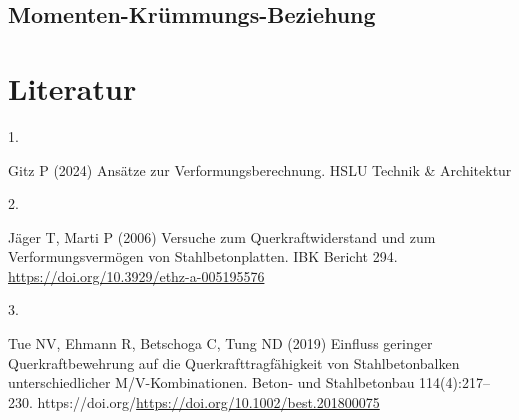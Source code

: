\documentclass[
  10pt,
  letterpaper,
]{scrreprt}
\newlength{\cslhangindent}
\newlength{\csllabelwidth}
\newenvironment{CSLReferences}[2] %
 {\begin{list}{}{%
  \setlength{\itemindent}{0pt}
  \setlength{\leftmargin}{0pt}
  \setlength{\parsep}{0pt}
  \ifodd #1
   \setlength{\leftmargin}{\cslhangindent}
   \setlength{\itemindent}{-1\cslhangindent}
  \fi
  \setlength{\itemsep}{#2\baselineskip}}}
 {\end{list}}
\newcommand{\CSLLeftMargin}[1]{\parbox[t]{\csllabelwidth}{\strut#1\strut}}
\newcommand{\CSLRightInline}[1]{\parbox[t]{\linewidth - \csllabelwidth}{\strut#1\strut}}
\begin{document}
\section{Momenten-Krümmungs-Beziehung}\label{momenten-kruxfcmmungs-beziehung}


\chapter*{Literatur}\label{literatur}


\label{refs}
\begin{CSLReferences}{0}{1}
\CSLLeftMargin{1. }%
\CSLRightInline{Gitz P (2024) Ansätze zur {Verformungsberechnung}. HSLU
Technik \& Architektur}

\CSLLeftMargin{2. }%
\CSLRightInline{Jäger T, Marti P (2006) Versuche zum
{Querkraftwiderstand} und zum {Verformungsvermögen} von
{Stahlbetonplatten}. IBK Bericht 294.
\url{https://doi.org/10.3929/ethz-a-005195576}}

\CSLLeftMargin{3. }%
\CSLRightInline{Tue NV, Ehmann R, Betschoga C, Tung ND (2019) Einfluss
geringer {Querkraftbewehrung} auf die {Querkrafttragfähigkeit} von
{Stahlbetonbalken} unterschiedlicher {M}/{V}-{Kombinationen}. Beton- und
Stahlbetonbau 114(4):217--230.
https://doi.org/\url{https://doi.org/10.1002/best.201800075}}

\end{CSLReferences}
\end{document}
